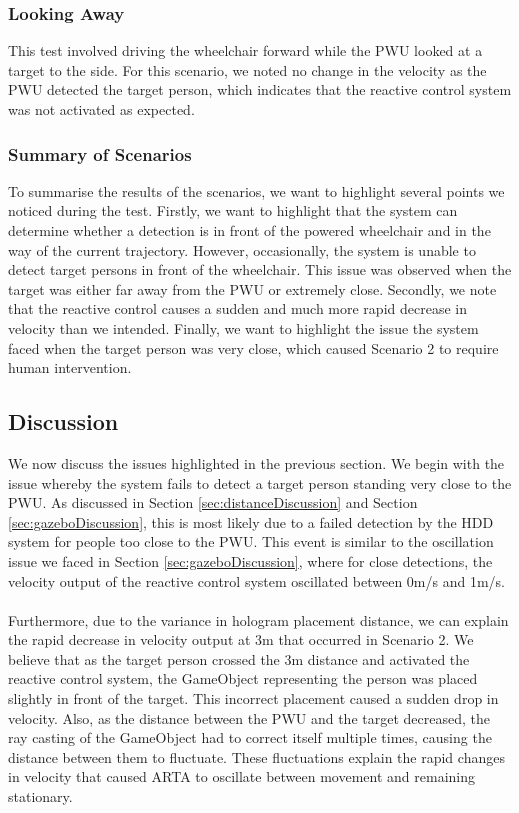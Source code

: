 \subsubsection{Looking Away}
This test involved driving the wheelchair forward while the PWU looked at a target to the side. For this scenario, we noted no change in the velocity as the PWU detected the target person, which indicates that the reactive control system was not activated as expected.

\subsubsection{Summary of Scenarios}
To summarise the results of the scenarios, we want to highlight several points we noticed during the test. Firstly, we want to highlight that the system can determine whether a detection is in front of the powered wheelchair and in the way of the current trajectory. However, occasionally, the system is unable to detect target persons in front of the wheelchair. This issue was observed when the target was either far away from the PWU or extremely close. Secondly, we note that the reactive control causes a sudden and much more rapid decrease in velocity than we intended. Finally, we want to highlight the issue the system faced when the target person was very close, which caused Scenario 2 to require human intervention.

\subsection{Discussion} \label{sec:fullSystemTest}
We now discuss the issues highlighted in the previous section. We begin with the issue whereby the system fails to detect a target person standing very close to the PWU. As discussed in Section \ref{sec:distanceDiscussion} and Section \ref{sec:gazeboDiscussion}, this is most likely due to a failed detection by the HDD system for people too close to the PWU. This event is similar to the oscillation issue we faced in Section \ref{sec:gazeboDiscussion}, where for close detections, the velocity output of the reactive control system oscillated between 0m/s and 1m/s. 

\paragraph{} Furthermore, due to the variance in hologram placement distance, we can explain the rapid decrease in velocity output at 3m that occurred in Scenario 2. We believe that as the target person crossed the 3m distance and activated the reactive control system, the GameObject representing the person was placed slightly in front of the target. This incorrect placement caused a sudden drop in velocity. Also, as the distance between the PWU and the target decreased, the ray casting of the GameObject had to correct itself multiple times, causing the distance between them to fluctuate. These fluctuations explain the rapid changes in velocity that caused ARTA to oscillate between movement and remaining stationary.

